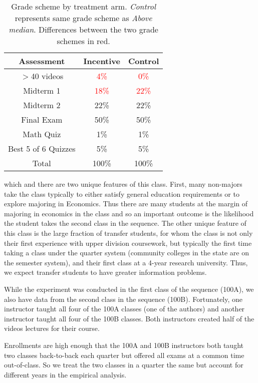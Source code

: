 \documentclass[12pt]{article}
\newcommand{\red}[1]{\textcolor{red}{#1}}
\begin{document}
\begin{table}
	\caption{Grade scheme by treatment arm. \textit{Control} represents same grade scheme as \textit{Above median}. Differences between the two grade schemes in red.}
	\centering
	\begin{tabular}{ c|c|c } 
		Assessment & Incentive & Control \\
		\hline
		$>$40 videos & \red{4\%} & \red{0\%} \\ 
		Midterm 1 & \red{18\%} & \red{22\%} \\ 
		Midterm 2 & 22\% & 22\% \\ 
		Final Exam & 50\% & 50\% \\ 
		Math Quiz & 1\% & 1\% \\ 
		Best 5 of 6 Quizzes & 5\% & 5\% \\ 
		\hline
		Total & 100\% & 100\% \\
	\end{tabular} 
	\label{gradescheme}
\end{table}



which and there are two unique features of this class.  First, many non-majors take the class typically to either satisfy general education requirements or to explore majoring in Economics.  Thus there are many students at the margin of majoring in economics in the class and so an important outcome is the likelihood the student takes the second class in the sequence.  The other unique feature of this class is the large fraction of transfer students, for whom the class is not only their first experience with upper division coursework, but typically the first time taking a class under the quarter system (community colleges in the state are on the semester system), and their first class at a 4-year research university.  Thus, we expect transfer students to have greater information problems. 

While the experiment was conducted in the first class of the sequence (100A), we also have data from the second class in the sequence (100B).  Fortunately, one instructor taught all four of the 100A classes (one of the authors) and another instructor taught all four of the 100B classes.  Both instructors created half of the videos lectures for their course.  

Enrollments are high enough that the 100A and 100B instructors both taught two classes back-to-back each quarter but offered all exams at a common time out-of-class.  So we treat the two classes in a quarter the same but account for different years in the empirical analysis.  
\end{document}
